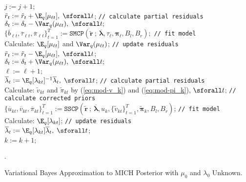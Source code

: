 \begin{algorithm}
{{      $j := j + 1$; \\
    }
     {
      $\tilde{r}_t := \tilde{r}_t + \E_q[\mu_{\ell t}],\; \sforall t$; \texttt{// calculate partial residuals} \\
      $\delta_t := \delta_t -  \Var_q(\mu_{\ell t}),\; \sforall t;$ \\
      $\{\overline{b}_{\ell t}, \overline{\tau}_{\ell t}, \overline{\pi}_{\ell t}\}_{t=1}^T := \texttt{SMCP}\left(\tilde{\mathbf{r}} \:;\: \overline{\pmb{\lambda}}, \tau_{\ell}, \pmb{\pi}_{\ell}, B_l,B_r\right);$ \texttt{// fit model} \\
      Calculate: $\E_q[\mu_{\ell t}]$ and $\Var_q(\mu_{\ell t})$; \texttt{// update residuals} \\
      $\tilde{r}_t := \tilde{r}_t - \E_q[\mu_{\ell t}],\; \sforall t$; \\
      $\delta_t := \delta_t + \Var_q(\mu_{\ell t}),\; \sforall t;$ \\
      $\ell := \ell + 1$; \\
    }
     {
      $\overline{\lambda}_t := \E_q[\lambda_{k t}]^{-1}\overline{\lambda}_t, \; \sforall t$; \texttt{// calculate partial residuals}\\
      Calculate: $\tilde{v}_{kt}$ and $\tilde{\pi}_{kt}$ by (\ref{eq:mod-v_k}) and (\ref{eq:mod-pi_k}), $\sforall t$; \texttt{// calculate corrected priors} \\
      $\{\overline{u}_{kt}, \overline{v}_{kt}, \overline{\pi}_{kt}\}_{t=1}^T := \texttt{SSCP}\left(\tilde{\mathbf{r}} 
      \:;\:\overline{\pmb{\lambda}}, u_k, \{\tilde{v}_{kt}\}_{t=1}^T, \tilde{\pmb{\pi}}_k, B_l,B_r\right)$; \texttt{// fit model} \\
      Calculate: $\E_q[\lambda_{k t}]$; \texttt{// update residuals} \\
      $\overline{\lambda}_t := \E_q[\lambda_{kt}]\overline{\lambda}_t, \; \sforall t$; \\
      $k := k + 1$; \\
    }

  }
  .
  \caption{Variational Bayes Approximation to MICH Posterior with $\mu_0$ and $\lambda_0$ Unknown.}
\end{algorithm}